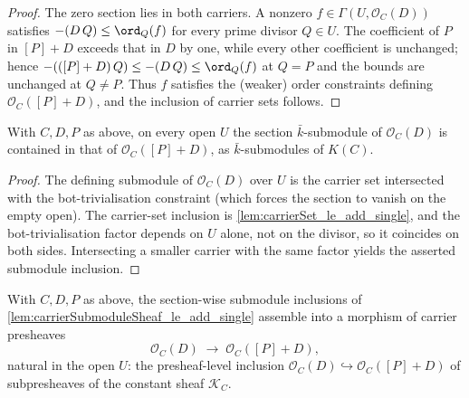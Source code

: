\begin{proof}
  The zero section lies in both carriers. A nonzero
  \(f \in \Gamma(U, \mathcal O_C(D))\) satisfies \(-(D\,Q) \leq \ord_Q(f)\)
  for every prime divisor \(Q \in U\). The coefficient of \(P\) in
  \([P]+D\) exceeds that in \(D\) by one, while every other coefficient is
  unchanged; hence \(-(([P]+D)\,Q) \leq -(D\,Q) \leq \ord_Q(f)\) at \(Q = P\)
  and the bounds are unchanged at \(Q \neq P\). Thus \(f\) satisfies the
  (weaker) order constraints defining \(\mathcal O_C([P]+D)\), and the
  inclusion of carrier sets follows.
\end{proof}

\begin{lemma}

  \label{lem:carrierSubmoduleSheaf_le_add_single}
  With \(C, D, P\) as above, on every open \(U\) the section
  \(\bar k\)-submodule of \(\mathcal O_C(D)\) is contained in that of
  \(\mathcal O_C([P]+D)\), as \(\bar k\)-submodules of \(K(C)\).
\end{lemma}

\begin{proof}
  The defining submodule of \(\mathcal O_C(D)\) over \(U\) is the carrier set
  intersected with the bot-trivialisation constraint (which forces the
  section to vanish on the empty open). The carrier-set inclusion is
  \cref{lem:carrierSet_le_add_single}, and the bot-trivialisation factor
  depends on \(U\) alone, not on the divisor, so it coincides on both sides.
  Intersecting a smaller carrier with the same factor yields the asserted
  submodule inclusion.
\end{proof}

\begin{definition}

  \label{lem:carrierPresheaf_le_hom}
  With \(C, D, P\) as above, the section-wise submodule inclusions of
  \cref{lem:carrierSubmoduleSheaf_le_add_single} assemble into a morphism of
  carrier presheaves
  \[
    \mathcal O_C(D) \;\longrightarrow\; \mathcal O_C([P]+D),
  \]
  natural in the open \(U\): the presheaf-level inclusion
  \(\mathcal O_C(D) \hookrightarrow \mathcal O_C([P]+D)\) of subpresheaves of
  the constant sheaf \(\mathcal K_C\).
\end{definition}

